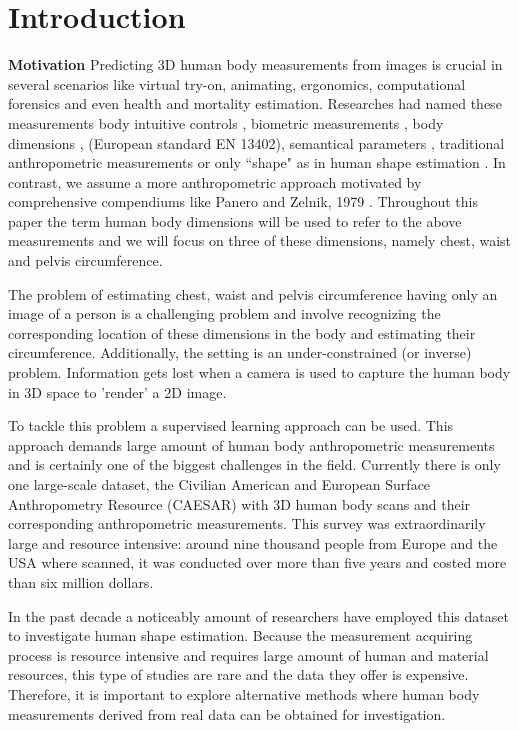 \documentclass[runningheads, orivec]{llncs}
\begin{document}
\section{Introduction}\label{sec:intro}
\textbf{Motivation} 
Predicting 3D human body measurements from images is crucial in several 
scenarios 
like virtual try-on, animating, ergonomics, computational forensics and 
even health and mortality estimation. Researches had 
named these
measurements body intuitive controls \cite{Allen.2003}, biometric 
measurements \cite{Sigal.2008}, body dimensions 
\cite{DBLP:conf/bmvc/ChenRC11}, (European standard EN 13402), semantical 
parameters \cite{Yang.2014}, 
traditional anthropometric 
measurements 
\cite{Wuhrer2011} or only ``shape" as in human shape estimation 
\cite{Guan.2013,Bogo:ECCV:2016,Loper.2015,Dibra.2016a,Pishchulin.2017}. In 
contrast, we assume a more 
anthropometric approach 
motivated by comprehensive compendiums like Panero and Zelnik, 1979 
\cite{panero1979human}.
Throughout this paper the term human body 
dimensions 
will be used to refer to the above measurements and we will focus on three of 
these dimensions, namely chest, waist and 
pelvis circumference.

The problem of estimating chest, waist and 
pelvis circumference having only an image of a person is a challenging problem 
and involve recognizing the corresponding location of these dimensions in the 
body and estimating their circumference. Additionally, the setting is an  
under-constrained  (or inverse) problem. Information 
gets lost when a camera is 
used to capture the human body in 3D space to 'render' a 2D image. 

To tackle this problem a supervised learning approach can be used. This approach
demands large amount of human body anthropometric measurements and is certainly 
one of the biggest challenges in the field.  Currently there 
is only one large-scale dataset, the Civilian American and 
European Surface Anthropometry Resource (CAESAR) \cite{robinette1999caesar} 
with 3D human body scans and their corresponding anthropometric measurements. 
This survey was extraordinarily large and resource intensive: around nine 
thousand people from Europe and the USA where scanned, it was conducted over 
more than five years and costed more than six million dollars.

In the past decade a noticeably amount of researchers have employed this 
dataset to investigate human shape estimation. Because the measurement 
acquiring process is resource intensive and requires large amount of human and 
material resources, this type of studies are rare and the data they offer is 
expensive. Therefore, it is important to explore alternative methods where 
human body measurements derived from real data can be obtained for 
investigation.
\end{document}
